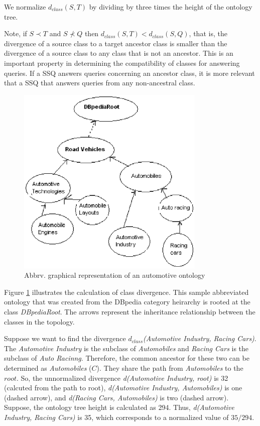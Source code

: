 \documentclass{www2010-submission}
\begin{document}
We normalize $d_{class}(S, T)$ by dividing by three times the height of the ontology tree.

Note, if $S \prec T$ and $S \not\prec Q$ then $d_{class}(S,T) < d_{class}(S,Q)$,
that is, the divergence of a source class to a target ancestor class is smaller than the divergence of a source class to any class that is not an ancestor. This is an important property in determining the compatibility of classes for answering queries.  If a SSQ answers queries concerning an ancestor class, it is more relevant that a SSQ that answers queries from any non-ancestral class. 

\begin{figure}[t]
\centering
\includegraphics[width=90mm]{class_divergence.eps}
\caption{Abbrv. graphical representation of an automotive ontology}
\label{fig:class_divergence}
\end{figure}

Figure \ref{fig:class_divergence} illustrates the calculation of class divergence. This sample abbreviated ontology that was created from the DBpedia category heirarchy is rooted at the class \textit{DBpediaRoot}. The arrows represent the inheritance relationship between the classes in the topology. 

Suppose we want to find the divergence $d_{class}$\textit{(Automotive Industry, Racing Cars)}. The \textit{Automotive Industry} is the subclass of \textit{Automobiles} and \textit{Racing Cars} is the subclass of \textit{Auto Racinng}. Therefore, the common ancestor for these two can be determined as \textit{Automobiles} ($C$). They share the path from \textit{Automobiles} to the $root$. So, the unnormalized divergence \textit{d(Automotive Industry, root)} is 32 (calcuted from the path to root), \textit{d(Automotive Industry, Automobiles)} is one (dashed arrow), and \textit{d(Racing Cars, Automobiles)} is two (dashed arrow). Suppose, the ontology tree height is calculated as 294. Thus, \textit{d(Automotive Industry, Racing Cars)} is 35, which corresponds to a normalized value of $35/294$. 
\end{document}
